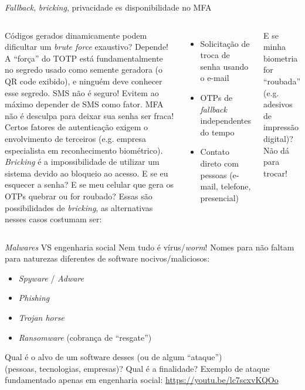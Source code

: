 \documentclass[utf8]{beamer}
\begin{document}
\begin{frame}{\emph{Fallback}, \emph{bricking},
              privacidade es disponibilidade no MFA}
  \fontsize{10pt}{10pt}\selectfont
  \begin{columns}[c]
    Códigos gerados dinamicamente
    podem dificultar um \emph{brute force} exaustivo?
    \vspace{.5em}\vfill
    Depende!
    A ``força'' do TOTP está fundamentalmente no segredo
    usado como semente geradora (o QR code exibido),
    e ninguém deve conhecer esse segredo.
    \vspace{.5em}\vfill
    SMS não é seguro! Evitem ao máximo depender de SMS como fator.
    \vspace{.5em}\vfill
    MFA não é desculpa para deixar sua senha ser fraca!
    \vspace{.5em}\vfill
    Certos fatores de autenticação
    exigem o envolvimento de terceiros
    (e.g. empresa especialista em reconhecimento biométrico).
    \emph{Bricking} é a impossibilidade de utilizar um sistema
    devido ao bloqueio ao acesso.
    \vspace{.5em}\vfill
    E se eu esquecer a senha?
    E se meu celular que gera os OTPs quebrar ou for roubado?
    Essas são possibilidades de \emph{bricking},
    as alternativas nesses casos costumam ser:
    \begin{itemize}
      \item Solicitação de troca de senha usando o e-mail
      \item OTPs de \emph{fallback} independentes do tempo
      \item Contato direto com pessoas (e-mail, telefone, presencial)
    \end{itemize}
    \vspace{.5em}\vfill
    E se minha biometria for ``roubada''
    (e.g. adesivos de impressão digital)?
    Não dá para trocar!
  \end{columns}
\end{frame}


\begin{frame}{\emph{Malwares} VS engenharia social}
  Nem tudo é vírus/\emph{worm}!
  Nomes para não faltam
  para naturezas diferentes de software nocivos/maliciosos:
  \begin{itemize}
    \item \emph{Spyware} / \emph{Adware}
    \item \emph{Phishing}
    \item \emph{Trojan horse}
    \item \emph{Ransomware} (cobrança de ``resgate'')
  \end{itemize}
  \vfill
  \centering
  Qual é o alvo de um software desses (ou de algum ``ataque'') \\
  (pessoas, tecnologias, empresas)?
  \vfill
  Qual é a finalidade?
  \vfill
  Exemplo de ataque fundamentado apenas em engenharia social:
  \url{https://youtu.be/lc7scxvKQOo}
\end{frame}
\end{document}
